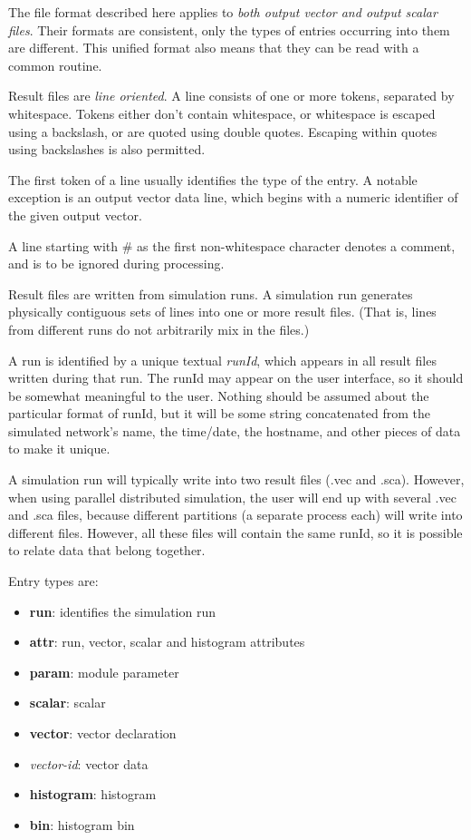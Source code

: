 \label{cha:result-file-formats}

The file format described here applies to \textit{both output vector and
output scalar files}. Their formats are consistent, only the types of
entries occurring into them are different. This unified format also
means that they can be read with a common routine.

Result files are \textit{line oriented}. A line consists of one or more
tokens, separated by whitespace. Tokens either don't
contain whitespace, or whitespace is escaped using a backslash, or
are quoted using double quotes. Escaping within quotes using
backslashes is also permitted.

The first token of a line usually identifies the type of the entry. A
notable exception is an output vector data line, which begins with a
numeric identifier of the given output vector.

A line starting with \# as the first non{}-whitespace character denotes
a comment, and is to be ignored during processing.

Result files are written from simulation runs. A simulation run
generates physically contiguous sets of lines into one or more result
files. (That is, lines from different runs do not arbitrarily mix in
the files.)

A run is identified by a unique textual\textit{ runId}, which appears in
all result files written during that run. The runId may appear on the
user interface, so it should be somewhat meaningful to the user.
Nothing should be assumed about the particular format of runId, but it
will be some string concatenated from the simulated network's name, the
time/date, the hostname, and other pieces of data to make it unique.

A simulation run will typically write into two result files (.vec and
.sca). However, when using parallel distributed simulation, the user
will end up with several .vec and .sca files, because different
partitions (a separate process each) will write into different files.
However, all these files will contain the same runId, so it is possible
to relate data that belong together.

Entry types are:

\begin{itemize}
    \item{\textbf{run}: identifies the simulation run}
    \item{\textbf{attr}: run, vector, scalar and histogram attributes}
    \item{\textbf{param}: module parameter}
    \item{\textbf{scalar}: scalar}
    \item{\textbf{vector}: vector declaration}
    \item{\textit{vector-id}: vector data}
    \item{\textbf{histogram}: histogram}
    \item{\textbf{bin}: histogram bin}
\end{itemize}



